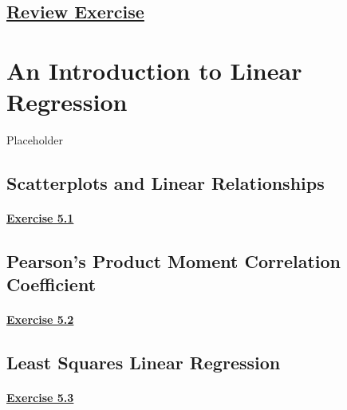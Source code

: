 \documentclass[
  11pt,
]{book}
\begin{document}
\section*{\texorpdfstring{\hyperref[re4a]{Review Exercise}}{Review Exercise}}\label{review-exercise-3}

\chapter{An Introduction to Linear Regression}\label{an-introduction-to-linear-regression}

Placeholder

\section{Scatterplots and Linear Relationships}\label{scatterplots-and-linear-relationships}

\subsubsection*{\texorpdfstring{\hyperref[ex51a]{Exercise 5.1}}{Exercise 5.1}}\label{exercise-5.1}

\section{Pearson's Product Moment Correlation Coefficient}\label{pearsons-product-moment-correlation-coefficient}

\subsubsection*{\texorpdfstring{\hyperref[ex52a]{Exercise 5.2}}{Exercise 5.2}}\label{exercise-5.2}

\section{Least Squares Linear Regression}\label{least-squares-linear-regression}

\subsubsection*{\texorpdfstring{\hyperref[ex53a]{Exercise 5.3}}{Exercise 5.3}}\label{exercise-5.3}
\end{document}
